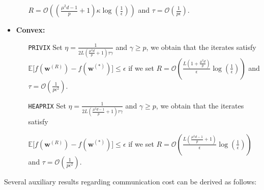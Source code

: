\documentclass[review,onefignum,onetabnum]{siamart190516}
\begin{document}
\begin{theorem}
\begin{itemize}
\begin{itemize}
     $R=\mathcal{O}\left(\left(\frac{\mu^2d-1}{p}+1\right)\kappa\log\left(\frac{1}{\epsilon}\right)\right)$ and $ \tau=\mathcal{O}\left(\frac{1}{p\epsilon}\right)$. 
      \end{itemize}
      
     \item \textbf{Convex:}
     \begin{itemize}
         \item [\texttt{PRIVIX}] Set $\eta=\frac{1}{2L\left(\frac{\mu^2d}{p}+1\right)\tau\gamma}$ and $\gamma\geq p$, we obtain that the iterates satisfy $ \mathbb{E}\Big[f({\boldsymbol{w}}^{(R)})-f({\boldsymbol{w}}^{(*)})\Big]\leq \epsilon$ if we set
     $R=\mathcal{O}\left(\frac{L\left(1+\frac{\mu^2d}{p}\right)}{\epsilon}\log\left(\frac{1}{\epsilon}\right)\right)$ and $ \tau=\mathcal{O}\left(\frac{1}{p\epsilon^2}\right).$
         \item [\texttt{HEAPRIX}] Set $\eta=\frac{1}{2L\left(\frac{\mu^2d-1}{p}+1\right)\tau\gamma}$ and $\gamma\geq p$, we obtain that the iterates satisfy 

$ \mathbb{E}\Big[f({\boldsymbol{w}}^{(R)})-f({\boldsymbol{w}}^{(*)})\Big]\leq \epsilon$ if we set
     $R=\mathcal{O}\left(\frac{L\left(\frac{\mu^2d-1}{p}+1\right)}{\epsilon}\log\left(\frac{1}{\epsilon}\right)\right)$ and $ \tau=\mathcal{O}\left(\frac{1}{p\epsilon^2}\right).$ 
     \end{itemize}
 \end{itemize}
\end{theorem}


Several auxiliary results regarding communication cost can be derived as follows:
\end{document}
